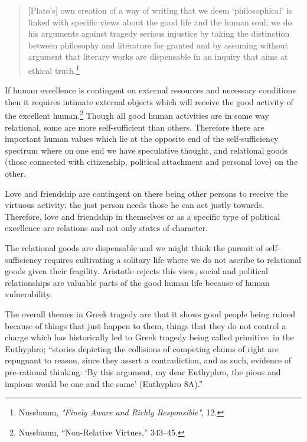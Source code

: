 \documentclass[phdthesis,12pt,final]{wuthesis}
\theoremstyle{definition}
\theoremstyle{definition}
\theoremstyle{definition}
\theoremstyle{definition}
\theoremstyle{remark}
\begin{document}
\begin{quote}
{[}Plato's{]} own creation of a way of writing that we deem `philosophical' is linked with specific views about the good life and the human soul; we do his arguments against tragedy serious injustice by taking the distinction between philosophy and literature for granted and by assuming without argument that literary works are dispensable in an inquiry that aims at ethical truth.\footnote{Nussbaum, \emph{"{Finely Aware} and {Richly Responsible}"}, 12.}
\end{quote}

If human excellence is contingent on external resources and necessary conditions then it requires intimate external objects which will receive the good activity of the excellent human.\footnote{Nussbaum, {``Non-Relative Virtues,''} 343--45.} Though all good human activities are in some way relational, some are more self-sufficient than others. Therefore there are important human values which lie at the opposite end of the self-sufficiency spectrum where on one end we have speculative thought, and relational goods (those connected with citizenship, political attachment and personal love) on the other.

Love and friendship are contingent on there being other persons to receive the virtuous activity; the just person needs those he can act justly towards. Therefore, love and friendship in themselves or as a specific type of political excellence are relations and not only states of character.

The relational goods are dispensable and we might think the pursuit of self-sufficiency requires cultivating a solitary life where we do not ascribe to relational goods given their fragility. Aristotle rejects this view, social and political relationships are valuable parts of the good human life because of human vulnerability.

The overall themes in Greek tragedy are that it shows good people being ruined because of things that just happen to them, things that they do not control a charge which has historically led to Greek tragedy being called primitive: in the Euthyphro; ``stories depicting the collisions of competing claims of right are repugnant to reason, since they assert a contradiction, and as such, evidence of pre-rational thinking: `By this argument, my dear Euthyphro, the pious and impious would be one and the same' (Euthyphro 8A).''
\end{document}
